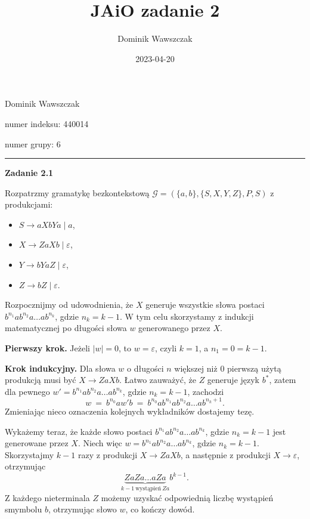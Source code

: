 \documentclass[12pt]{article}
\title{JAiO zadanie 2}
\author{Dominik Wawszczak}
\date{2023-04-20}
\begin{document}
	\setlength{\parindent}{0 cm}
	
	Dominik Wawszczak
	
	numer indeksu: 440014
	
	numer grupy: 6
	
	\bigskip
	\hrule
	\bigskip
	
	\textbf{Zadanie 2.1}
	
	\medskip
	
	Rozpatrzmy gramatykę bezkontekstową \(\mathcal{G} = \left( \{a, b\}, \{S, X,
	Y, Z\}, P, S \right)\) z produkcjami:
	\begin{itemize}
		\item \(S \longrightarrow aXbYa \mid a\),
		\item \(X \longrightarrow ZaXb \mid \varepsilon\),
		\item \(Y \longrightarrow bYaZ \mid \varepsilon\),
		\item \(Z \longrightarrow bZ \mid \varepsilon\).
	\end{itemize}
	
	\medskip
	
	Rozpocznijmy od udowodnienia, że \(X\) generuje wszystkie słowa postaci
	\(b^{n_{1}} a b^{n_{2}} a \ldots a b^{n_{k}}\), gdzie \(n_{k} = k - 1\). W
	tym celu skorzystamy z indukcji matematycznej po długości słowa \(w\)
	generowanego przez \(X\).
	
	\medskip
	
	\textbf{Pierwszy krok.} Jeżeli \(\left| w \right| = 0\), to \(w =
	\varepsilon\), czyli \(k = 1\), a \(n_{1} = 0 = k - 1\).
	
	\medskip
	
	\textbf{Krok indukcyjny.} Dla słowa \(w\) o długości \(n\) większej niż
	\(0\) pierwszą użytą produkcją musi być \(X \longrightarrow ZaXb\). Łatwo
	zauważyć, że \(Z\) generuje język \(b^{\ast}\), zatem dla pewnego \(w' =
	b^{n_{1}} a b^{n_{2}} a \ldots a b^{n_{k}}\), gdzie \(n_k = k - 1\),
	zachodzi
	\[ w \ = \ b^{n_{0}} a w' b \ = \ b^{n_{0}} a b^{n_{1}} a b^{n_{2}} a \ldots
	a b^{n_{k} + 1} \text{.} \]
	Zmieniając nieco oznaczenia kolejnych wykładników dostajemy tezę.
	
	\medskip
	
	Wykażemy teraz, że każde słowo postaci \(b^{n_{1}} a b^{n_{2}} a \ldots a
	b^{n_{k}}\), gdzie \(n_{k} = k - 1\) jest generowane przez \(X\). Niech więc
	\(w = b^{n_{1}} a b^{n_{2}} a \ldots a b^{n_{k}}\), gdzie \(n_{k} = k - 1\).
	Skorzystajmy \(k - 1\) razy z produkcji \(X \longrightarrow ZaXb\), a
	następnie z produkcji \(X \longrightarrow \varepsilon\), otrzymując
	\[ \underbrace{Z a Z a \ldots a Z a}_{k - 1 \ \text{wystąpień} \ Z a} b^{k - 1}
	\text{.} \]
	Z każdego nieterminala \(Z\) możemy uzyskać odpowiednią liczbę wystąpień
	smymbolu \(b\), otrzymując słowo \(w\), co kończy dowód.
	
\end{document}
